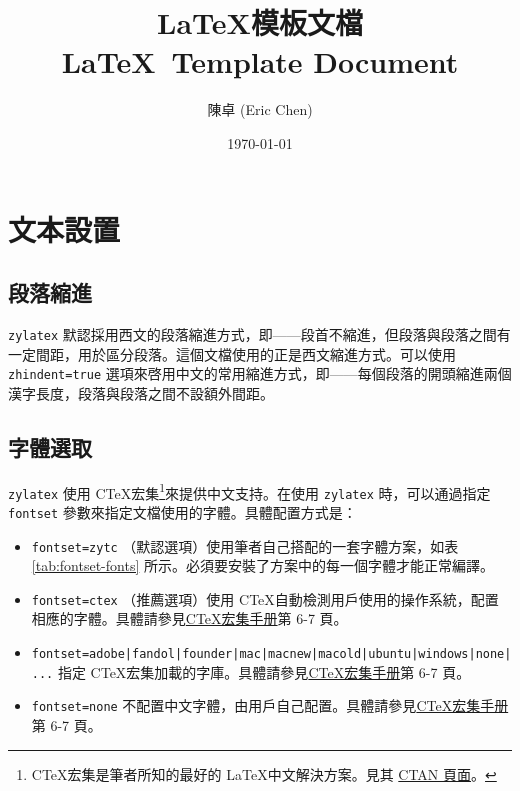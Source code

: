 \documentclass[
oneside,
12pt,
]{book}
\title{
  \Huge \LaTeX 模板文檔 \\
  \Large \LaTeX\ Template Document
}
\author{
  陳卓 (Eric Chen)
}
\date{\today}
\begin{document}
\maketitle

\tableofcontents

\chapter{文本設置}

\section{段落縮進}

\texttt{zylatex} 默認採用西文的段落縮進方式，即——段首不縮進，但段落與段落之間有一定間距，用於區分段落。這個文檔使用的正是西文縮進方式。可以使用 \texttt{zhindent=true} 選項來啓用中文的常用縮進方式，即——每個段落的開頭縮進兩個漢字長度，段落與段落之間不設額外間距。

\section{字體選取}

\texttt{zylatex} 使用 C\TeX 宏集\footnote{C\TeX 宏集是筆者所知的最好的 \LaTeX 中文解決方案。見其 \href{https://ctan.org/pkg/ctex}{CTAN 頁面}。}來提供中文支持。在使用 \texttt{zylatex} 時，可以通過指定 \texttt{fontset} 參數來指定文檔使用的字體。具體配置方式是：

\begin{itemize}
\item \texttt{fontset=zytc} （默認選項）使用筆者自己搭配的一套字體方案，如表 \ref{tab:fontset-fonts} 所示。必須要安裝了方案中的每一個字體才能正常編譯。
\item \texttt{fontset=ctex} （推薦選項）使用 C\TeX 自動檢測用戶使用的操作系統，配置相應的字體。具體請參見\href{http://mirrors.ctan.org/language/chinese/ctex/ctex.pdf}{C\TeX 宏集手册}第 6-7 頁。
\item \texttt{fontset=adobe|fandol|founder|mac|macnew|macold|ubuntu|windows|none|...} 指定 C\TeX 宏集加載的字庫。具體請參見\href{http://mirrors.ctan.org/language/chinese/ctex/ctex.pdf}{C\TeX 宏集手册}第 6-7 頁。
\item \texttt{fontset=none} 不配置中文字體，由用戶自己配置。具體請參見\href{http://mirrors.ctan.org/language/chinese/ctex/ctex.pdf}{C\TeX 宏集手册}第 6-7 頁。
\end{itemize}
\end{document}

